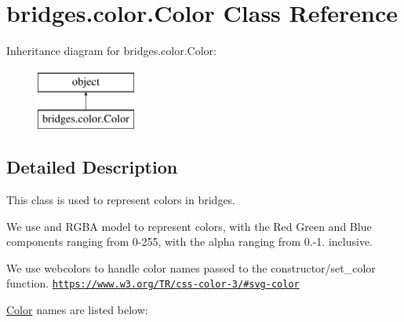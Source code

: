 \hypertarget{classbridges_1_1color_1_1_color}{}\section{bridges.\+color.\+Color Class Reference}
\label{classbridges_1_1color_1_1_color}
Inheritance diagram for bridges.\+color.\+Color\+:\begin{figure}[H]
\begin{center}
\leavevmode
\includegraphics[height=2.000000cm]{classbridges_1_1color_1_1_color}
\end{center}
\end{figure}


\subsection{Detailed Description}
This class is used to represent colors in bridges. 

We use and R\+G\+BA model to represent colors, with the Red Green and Blue components ranging from 0-\/255, with the alpha ranging from 0.-\/1. inclusive.

We use webcolors to handle color names passed to the constructor/set\+\_\+color function. \href{https://www.w3.org/TR/css-color-3/#svg-color}{\tt https\+://www.\+w3.\+org/\+T\+R/css-\/color-\/3/\#svg-\/color}

\hyperlink{classbridges_1_1color_1_1_color}{Color} names are listed below\+:~\newline


